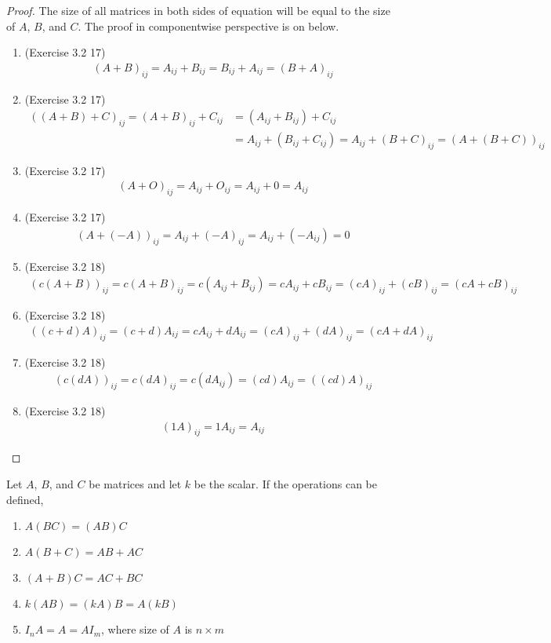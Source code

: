 \begin{proof}
	The size of all matrices in both sides of equation will be equal to the size of $A$, $B$, and $C$. The proof in componentwise perspective is on below.
	\begin{enumerate}
		\item (Exercise 3.2 17)
		\begin{align*}
		(A+B)_{ij} = A_{ij} + B_{ij} = B_{ij} + A_{ij} = (B+A)_{ij}
		\end{align*}
		\item (Exercise 3.2 17)
		\begin{align*}
		((A+B)+C)_{ij} = (A+B)_{ij} + C_{ij} &= (A_{ij} + B_{ij}) + C_{ij} \\
		&= A_{ij} + (B_{ij} + C_{ij}) = A_{ij} + (B+C)_{ij} = (A+(B+C))_{ij}
		\end{align*}
		\item (Exercise 3.2 17)
		\begin{align*}
		(A+O)_{ij} = A_{ij} + O_{ij} = A_{ij} + 0 = A_{ij}
		\end{align*}
		\item (Exercise 3.2 17)
		\begin{align*}
		(A+(-A))_{ij} = A_{ij} + (-A)_{ij} = A_{ij} + (-A_{ij}) = 0
		\end{align*}
		\item (Exercise 3.2 18)
		\begin{align*}
		(c(A+B))_{ij} = c(A+B)_{ij} = c(A_{ij} + B_{ij}) = cA_{ij} + cB_{ij} = (cA)_{ij} + (cB)_{ij} = (cA + cB)_{ij}
		\end{align*}
		\item (Exercise 3.2 18)
		\begin{align*}
		((c+d)A)_{ij} = (c+d)A_{ij} = cA_{ij} + dA_{ij} = (cA)_{ij} + (dA)_{ij} = (cA + dA)_{ij}
		\end{align*}
		\item (Exercise 3.2 18)
		\begin{align*}
		(c(dA))_{ij} = c(dA)_{ij} = c(dA_{ij}) = (cd)A_{ij} = ((cd)A)_{ij}
		\end{align*}
		\item (Exercise 3.2 18)
		\begin{align*}
		(1A)_{ij} = 1A_{ij} = A_{ij}
		\end{align*}
	\end{enumerate}
\end{proof}

\begin{theorem} 
	Let $A$, $B$, and $C$ be matrices and let $k$ be the scalar. If the operations can be defined,
	\begin{enumerate}
		\item $A(BC) = (AB)C$
		\item $A(B+C) = AB + AC$
		\item $(A+B)C = AC + BC$
		\item $k(AB) = (kA)B = A(kB)$
		\item $I_nA = A = AI_m$, where size of $A$ is $n \times m$
	\end{enumerate}
\end{theorem}

